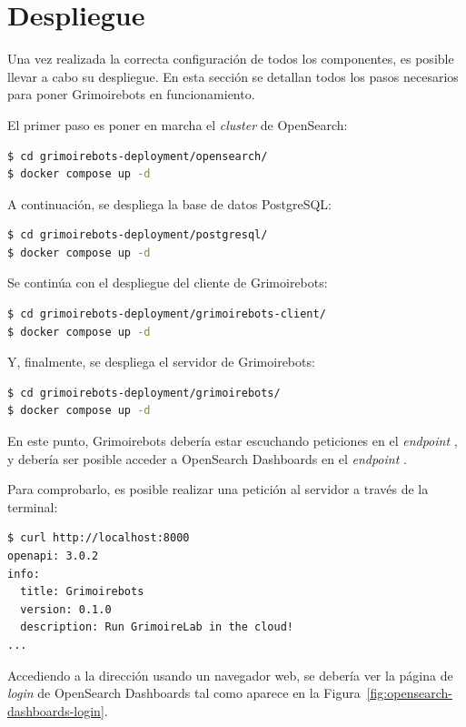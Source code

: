 \section{Despliegue}

Una vez realizada la correcta configuración de todos los componentes, es posible llevar a cabo su despliegue. En esta sección se detallan todos los pasos necesarios para poner Grimoirebots en funcionamiento.

El primer paso es poner en marcha el \emph{cluster} de OpenSearch\index{}:

\begin{lstlisting}[language=bash]
$ cd grimoirebots-deployment/opensearch/
$ docker compose up -d
\end{lstlisting}

A continuación, se despliega la base de datos PostgreSQL\index{}:

\begin{lstlisting}[language=bash]
$ cd grimoirebots-deployment/postgresql/
$ docker compose up -d
\end{lstlisting}

Se continúa con el despliegue del cliente de Grimoirebots:

\begin{lstlisting}[language=bash]
$ cd grimoirebots-deployment/grimoirebots-client/
$ docker compose up -d
\end{lstlisting}

Y, finalmente, se despliega el servidor de Grimoirebots:

\begin{lstlisting}[language=bash]
$ cd grimoirebots-deployment/grimoirebots/
$ docker compose up -d
\end{lstlisting}

En este punto, Grimoirebots debería estar escuchando peticiones en el \emph{endpoint} , y debería ser posible acceder a OpenSearch Dashboards en el \emph{endpoint} .

Para comprobarlo, es posible realizar una petición al servidor a través de la terminal:

\begin{lstlisting}[language=bash]
$ curl http://localhost:8000
openapi: 3.0.2
info:
  title: Grimoirebots
  version: 0.1.0
  description: Run GrimoireLab in the cloud!
...
\end{lstlisting}

Accediendo a la dirección  usando un navegador web, se debería ver la página de \emph{login} de OpenSearch Dashboards tal como aparece en la Figura~\ref{fig:opensearch-dashboards-login}.

